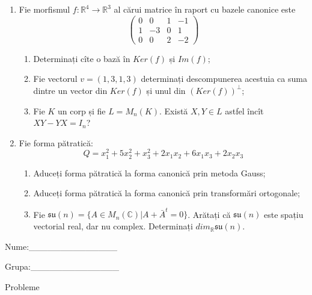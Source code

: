 \documentclass{article}
\begin{document}
\begin{enumerate}
 \item Fie morfismul $f:\mathbb{R}^4 \to \mathbb{R}^3$ al cărui matrice în raport cu bazele canonice este
$$\begin{pmatrix}
0&0&1&-1\\
1&-3&0&1\\
0&0&2&-2
\end{pmatrix}$$

\begin{enumerate}
\item Determinați cîte o bază în $Ker(f)$ și $Im(f)$;
\item Fie vectorul $v=(1,3,1,3)$ determinați descompunerea acestuia ca suma dintre un vector din $Ker(f)$ și unul din $(Ker(f))^\perp$;
\item Fie $K$ un corp și fie $L=M_n(K)$. Există $X,Y \in L$ astfel încît $XY-YX=I_n$?  
\end{enumerate}
\item Fie forma pătratică:
$$Q= x_1^2+5x_2^2+x_3^2+2x_1x_2+6x_1x_3+2x_2x_3$$

\begin{enumerate}
\item Aduceți forma pătratică la forma canonică prin metoda Gauss;
\item Aduceți forma pătratică la forma canonică prin transformări ortogonale;
\item Fie $\mathfrak{su}(n)=\{ A \in M_n(\mathbb{C}) | A+\bar{A}^t=0\}$. Arătați că $\mathfrak{su}(n)$ este spațiu vectorial real, dar nu complex.
Determinați $dim_{\mathbb{R}}\mathfrak{su}(n)$.
\end{enumerate}
\end{enumerate}
\newpage
\begin{flushright}
Nume:\_\_\_\_\_\_\_\_\_\_\_\_\_\_
 
 
Grupa:\_\_\_\_\_\_\_\_\_\_\_\_\_\_
\end{flushright}
\begin{center}
\vspace{2cm}
{\Large Probleme}
\vspace{2cm}
\end{center}
\end{document}
